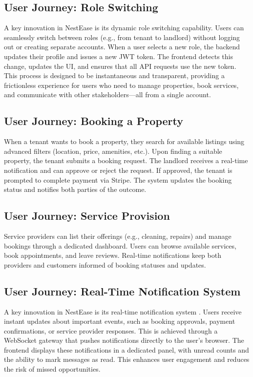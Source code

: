 \documentclass[conference]{IEEEtran}
\begin{document}
\subsection{User Journey: Role Switching}
A key innovation in NestEase is its dynamic role switching capability. Users can seamlessly switch between roles (e.g., from tenant to landlord) without logging out or creating separate accounts. When a user selects a new role, the backend updates their profile and issues a new JWT token. The frontend detects this change, updates the UI, and ensures that all API requests use the new token. This process is designed to be instantaneous and transparent, providing a frictionless experience for users who need to manage properties, book services, and communicate with other stakeholders—all from a single account.

\subsection{User Journey: Booking a Property}
When a tenant wants to book a property, they search for available listings using advanced filters (location, price, amenities, etc.). Upon finding a suitable property, the tenant submits a booking request. The landlord receives a real-time notification and can approve or reject the request. If approved, the tenant is prompted to complete payment via Stripe. The system updates the booking status and notifies both parties of the outcome.

\subsection{User Journey: Service Provision}
Service providers can list their offerings (e.g., cleaning, repairs) and manage bookings through a dedicated dashboard. Users can browse available services, book appointments, and leave reviews. Real-time notifications keep both providers and customers informed of booking statuses and updates.

\subsection{User Journey: Real-Time Notification System}
A key innovation in NestEase is its real-time notification system \cite{websocket_architecture}. Users receive instant updates about important events, such as booking approvals, payment confirmations, or service provider responses. This is achieved through a WebSocket gateway that pushes notifications directly to the user's browser. The frontend displays these notifications in a dedicated panel, with unread counts and the ability to mark messages as read. This enhances user engagement and reduces the risk of missed opportunities.
\end{document}

